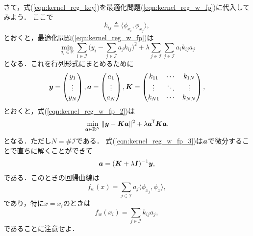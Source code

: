 さて，式(\ref{eqn:kernel_reg_key})を最適化問題(\ref{eqn:kernel_reg_w_fp})に代入してみよう．
ここで
\begin{equation}
k_{ij} \triangleq \langle \phi_{x_i}, \phi_{x_j} \rangle,
\end{equation}
とおくと，最適化問題(\ref{eqn:kernel_reg_w_fp})は
\begin{equation}
\label{eqn:kernel_reg_w_fp_2}
\min_{a_i \in \mathbb{R}} \sum_{i \in \mathcal{I}} \biggl( y_i - \sum_{j \in \mathcal{I}} a_j k_{ij} \biggr)^2
+ \lambda \sum_{j \in \mathcal{I}} \sum_{j \in \mathcal{I}} a_i k_{ij} a_j
\end{equation}
となる．これを行列形式にまとめるために
\begin{equation}
\boldsymbol{y} =
\begin{pmatrix}
y_1 \\ \vdots \\ y_N
\end{pmatrix},
\boldsymbol{a} =
\begin{pmatrix}
a_1 \\ \vdots \\ a_N
\end{pmatrix},
\boldsymbol{K} =
\begin{pmatrix}
k_{11} & \cdots & k_{1N} \\
\vdots & \ddots & \vdots \\
k_{N1} & \cdots & k_{NN} \\
\end{pmatrix},
\end{equation}
とおくと，式(\ref{eqn:kernel_reg_w_fp_2})は
\begin{equation}
\label{eqn:kernel_reg_w_fp_3}
\min_{\boldsymbol{a} \in \mathbb{R}^N} \| \boldsymbol{y} - \boldsymbol{Ka} \|^2 + \lambda \boldsymbol{a}^{\mkern-1.5mu\mathsf{T}}\boldsymbol{Ka},
\end{equation}
となる．ただし$N = \#\mathcal{I}$である．
式(\ref{eqn:kernel_reg_w_fp_3})は$\boldsymbol{a}$で微分することで直ちに解くことができて
\begin{equation}
\boldsymbol{a} = (\boldsymbol{K} + \lambda \boldsymbol{I})^{-1} \boldsymbol{y},
\end{equation}
である．このときの回帰曲線は
\begin{equation}
f_w(x) = \sum_{j \in \mathcal{I}} a_j \langle \phi_{x_j}, \phi_x \rangle,
\end{equation}
であり，特に$x = x_i$のときは
\begin{equation}
\label{eqn:kernel_reg_curve}
f_w(x_i) = \sum_{j \in \mathcal{I}} k_{ij} a_j,
\end{equation}
であることに注意せよ．

